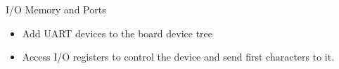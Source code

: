 \setuplabframe
{I/O Memory and Ports}
{
\begin{itemize}
\item Add UART devices to the board device tree
\item Access I/O registers to control the device and
      send first characters to it.
\end{itemize}
}
